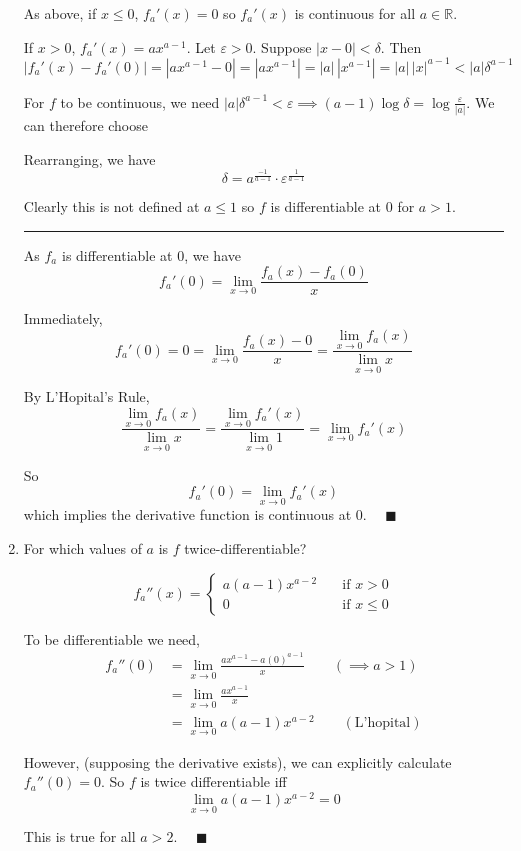 \documentclass[12pt]{article}
\newcommand{\R}{\mathbb{R}}
\newcommand{\qed}{\quad \blacksquare}
\newcommand{\abs}[1]{\left\vert #1 \right\vert}
\newcommand{\ep}{\varepsilon}
\begin{document}
\begin{enumerate}
            As above, if $x \leq 0$, $f_a'(x) = 0$ so $f_a'(x)$ is continuous for all $a \in \R$. 

            If $x > 0$, $f_a'(x) = ax^{a-1}$. Let $\ep > 0$. Suppose $\abs{x - 0} < \delta$. Then
            \[\abs{f_a'(x) - f_a'(0)} = \abs{ax^{a-1} - 0} = \abs{ax^{a-1}} = \abs{a}\, \abs{x^{a-1}} = \abs{a}\, \abs{x}^{a - 1} < \abs{a}\delta^{a-1}\]

            For $f$ to be continuous, we need $\abs{a}\delta^{a-1} < \ep \implies (a - 1) \log \delta = \log \frac{\ep}{\abs{a}}$. We can therefore choose 
            
            Rearranging, we have
            \[\delta = a^{\frac{-1}{a - 1}} \cdot \ep^{\frac{1}{a - 1}}\]

            Clearly this is not defined at $a \leq 1$ so $f$ is differentiable at $0$ for $a > 1$.

            \vspace*{10pt}
            \hrule 
            \vspace*{10pt}

            As $f_a$ is differentiable at $0$, we have 
            \[f_a'(0) = \lim_{x \to 0} \frac{f_a(x) - f_a(0)}{x}\]

            Immediately, 
            \[f_a'(0) = 0 = \lim_{x \to 0} \frac{f_a(x) - 0}{x} = \frac{\lim_{x \to 0} f_a(x)}{\lim_{x \to 0} x} \]

            By L'Hopital's Rule, 
            \[ \frac{\lim_{x \to 0} f_a(x)}{\lim_{x \to 0} x} = \frac{\lim_{x \to 0} f_a'(x)}{\lim_{x \to 0} 1} = \lim_{x \to 0} f_a'(x)\]

            So 
            \[f_a'(0) = \lim_{x \to 0} f_a'(x)\]
            which implies the derivative function is continuous at $0$. $\qed$
        \color{black}

	\item For which values of $a$ is $f$ twice-differentiable?
	
        \color{blue}
            \[f_a''(x) = \begin{cases}
                a(a-1)x^{a-2} \quad &\text{if } x > 0\\
                0 \quad &\text{if } x \leq 0
            \end{cases}\]

            To be differentiable we need, 
            \begin{align*}
                f_a''(0) &= \lim_{x \to 0} \frac{ax^{a-1} -  a(0)^{a-1}}{x} \qquad (\implies a > 1)\\
                &= \lim_{x \to 0} \frac{ax^{a-1}}{x}\\ 
                &= \lim_{x \to 0} a(a-1)x^{a-2} \qquad (\text{L'hopital})
            \end{align*}

            However, (supposing the derivative exists), we can explicitly calculate $f_a''(0) = 0$. So $f$ is twice differentiable iff
            \[\lim_{x \to 0} a(a-1)x^{a-2} = 0\]

            This is true for all $a > 2$. $\qed$
   
    \color{black}
\end{enumerate}
\end{document}
